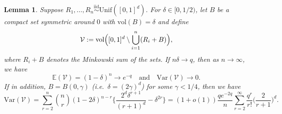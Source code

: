 \documentclass[11pt]{article}
\newtheorem{lemma}[thm]{Lemma}
\newcommand{\vol}{\mathrm{vol}}
\newcommand{\var}{\mathrm{Var}}
\begin{document}
\begin{lemma}
\label{le: VacancyLimitRandomRef}
Suppose $R_1,\ldots,R_n \stackrel{\mathrm{iid}}{\sim}\mathrm{Unif}([0,1]^d)$. For $\delta \in [0, 1/2)$, let $B$ be a compact set symmetric around $0$ with $\vol(B) = \delta$ and define
    \[
    \mathcal{V}:=\vol\Bigl([0,1]^d\setminus \bigcup_{i=1}^n (R_i + B)\Bigr),
    \]
    where $R_i + B$ denotes the Minkowski sum of the sets. 
    If $n\delta\to q$, then as $n\to\infty$, we have 
    \[
    \mathbb{E}(\mathcal{V})  = (1-\delta)^n \to e^{-q} \quad\text{and}\quad \var(\mathcal{V}) \to 0.
    \]
    If in addition, $B = B(0, \gamma)$ (i.e.\ $\delta = (2\gamma)^d$) for some $\gamma < 1/4$, then we have 
    \[  
    \var(\mathcal{V}) = \sum_{r=2}^n \binom{n}{r}(1-2\delta)^{n-r}\biggl\{\frac{2^d\delta^{r+1}}{(r+1)^d} - \delta^{2r}\biggr\} = (1+o(1))\frac{qe^{-2q}}{n}\sum_{r=2}^\infty \frac{q^r}{r!}\biggl(\frac{2}{r+1}\biggr)^d.
    \]
\end{lemma}
\end{document}
